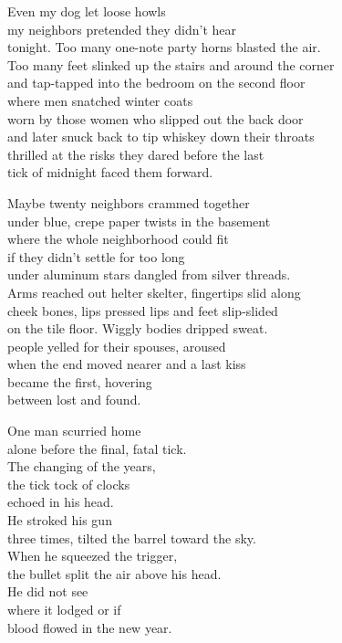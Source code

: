 \documentclass[twoside,10pt]{book}
\begin{document}
Even my dog let loose howls\\
my neighbors pretended they didn't hear\\
tonight. Too many one-note party horns blasted the air.\\
Too many feet slinked up the stairs and around the corner\\
and tap-tapped into the bedroom on the second floor\\
where men snatched winter coats\\
worn by those women who slipped out the back door\\
and later snuck back to tip whiskey down their throats\\
thrilled at the risks they dared before the last\\
tick of midnight faced them forward.

Maybe twenty neighbors crammed together\\
under blue, crepe paper twists in the basement\\
where the whole neighborhood could fit\\
if they didn't settle for too long\\
under aluminum stars dangled from silver threads.\\
Arms reached out helter skelter, fingertips slid along\\
cheek bones, lips pressed lips and feet slip-slided\\
on the tile floor. Wiggly bodies dripped sweat.\\
people yelled for their spouses, aroused\\
when the end moved nearer and a last kiss\\
became the first, hovering\\
between lost and found.

One man scurried home\\
alone before the final, fatal tick.\\
The changing of the years,\\
the tick tock of clocks\\
echoed in his head.\\
He stroked his gun\\
three times, tilted the barrel toward the sky.\\
When he squeezed the trigger,\\
the bullet split the air above his head.\\
He did not see\\
where it lodged or if\\
blood flowed in the new year.
\end{document}
